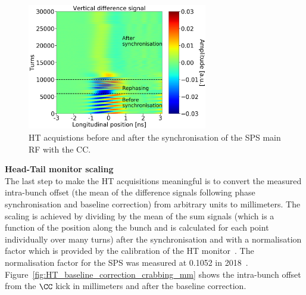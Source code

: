 \begin{figure}[!h]
   \centering         
   \includegraphics[width=0.7\textwidth]{images/Ch4/HT_2D__20180530_135105_before_after_sunchronisation_new_version.png}
       \caption{HT acquistions before and after the synchronisation of the SPS main RF with the CC.}
       \label{fig:HT_baseline_correction_measurements_2D}
\end{figure}


\normalsize{\textbf{Head-Tail monitor scaling}}\\
The last step to make the HT acquisitions meaningful is to convert the measured intra-bunch offset (the mean of the difference signals following phase synchronisation and baseline correction) from arbitrary units to millimeters. The scaling is achieved by dividing by the mean of the sum signals (which is a function of the position along the bunch and is calculated for each point individually over many turns) after the synchronisation and with a normalisation factor which is provided by the calibration of the HT monitor~\cite{PhysRevAccelBeams.22.112803}. The normalisation factor for the SPS was measured at 0.1052 in 2018~\cite{HT_calibration_2018}. Figure~\ref{fig:HT_baseline_correction_crabbing_mm} shows the intra-bunch offset from the $\CC$ kick in millimeters and after the baseline correction. 

